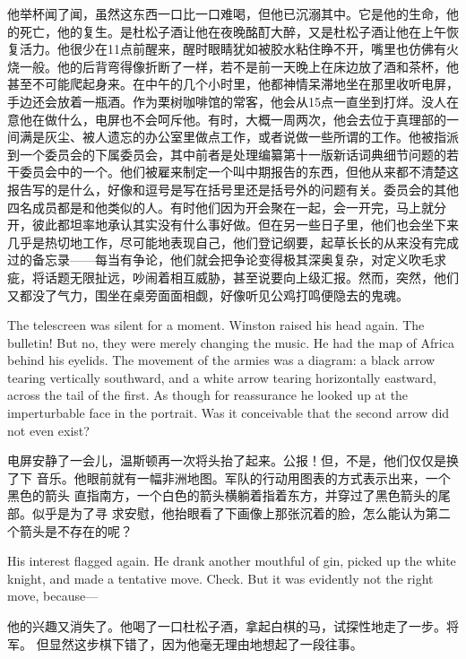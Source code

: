 \begin{paracol}{2}
他举杯闻了闻，虽然这东西一口比一口难喝，但他已沉溺其中。它是他的生命，他的死亡，他的复生。是杜松子酒让他在夜晚酩酊大醉，又是杜松子酒让他在上午恢复活力。他很少在11点前醒来，醒时眼睛犹如被胶水粘住睁不开，嘴里也仿佛有火烧一般。他的后背弯得像折断了一样，若不是前一天晚上在床边放了酒和茶杯，他甚至不可能爬起身来。在中午的几个小时里，他都神情呆滞地坐在那里收听电屏，手边还会放着一瓶酒。作为栗树咖啡馆的常客，他会从15点一直坐到打烊。没人在意他在做什么，电屏也不会呵斥他。有时，大概一周两次，他会去位于真理部的一间满是灰尘、被人遗忘的办公室里做点工作，或者说做一些所谓的工作。他被指派到一个委员会的下属委员会，其中前者是处理编纂第十一版新话词典细节问题的若干委员会中的一个。他们被雇来制定一个叫中期报告的东西，但他从来都不清楚这报告写的是什么，好像和逗号是写在括号里还是括号外的问题有关。委员会的其他四名成员都是和他类似的人。有时他们因为开会聚在一起，会一开完，马上就分开，彼此都坦率地承认其实没有什么事好做。但在另一些日子里，他们也会坐下来几乎是热切地工作，尽可能地表现自己，他们登记纲要，起草长长的从来没有完成过的备忘录——每当有争论，他们就会把争论变得极其深奥复杂，对定义吹毛求疵，将话题无限扯远，吵闹着相互威胁，甚至说要向上级汇报。然而，突然，他们又都没了气力，围坐在桌旁面面相觑，好像听见公鸡打鸣便隐去的鬼魂。

\switchcolumn*

The telescreen was silent for a moment. Winston raised his head again.
The bulletin! But no, they were merely changing the music. He had the
map of Africa behind his eyelids. The movement of the armies was a
diagram: a black arrow tearing vertically southward, and a white arrow
tearing horizontally eastward, across the tail of the first. As though
for reassurance he looked up at the imperturbable face in the portrait.
Was it conceivable that the second arrow did not even exist?

\switchcolumn

电屏安静了一会儿，温斯顿再一次将头抬了起来。公报！但，不是，他们仅仅是换了下
音乐。他眼前就有一幅非洲地图。军队的行动用图表的方式表示出来，一个黑色的箭头
直指南方，一个白色的箭头横躺着指着东方，并穿过了黑色箭头的尾部。似乎是为了寻
求安慰，他抬眼看了下画像上那张沉着的脸，怎么能认为第二个箭头是不存在的呢？

\switchcolumn*

His interest flagged again. He drank another mouthful of gin, picked up
the white knight, and made a tentative move. Check. But it was evidently
not the right move, because---

\switchcolumn

他的兴趣又消失了。他喝了一口杜松子酒，拿起白棋的马，试探性地走了一步。将军。
但显然这步棋下错了，因为他毫无理由地想起了一段往事。


\end{paracol}
